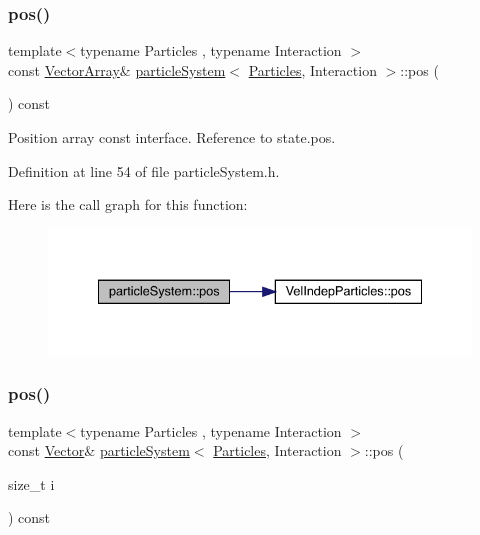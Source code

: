 \subsubsection{\texorpdfstring{pos()}{pos()}\hspace{0.1cm}{\footnotesize\ttfamily [1/2]}}
{\footnotesize\ttfamily template$<$typename Particles , typename Interaction $>$ \\
const \mbox{\hyperlink{classparticle_system_ac8049667a0d05e76b836642503a71c12}{Vector\+Array}}\& \mbox{\hyperlink{classparticle_system}{particle\+System}}$<$ \mbox{\hyperlink{struct_particles}{Particles}}, Interaction $>$\+::pos (\begin{DoxyParamCaption}{ }\end{DoxyParamCaption}) const\hspace{0.3cm}{\ttfamily [inline]}}



Position array const interface. Reference to state.\+pos. 



Definition at line 54 of file particle\+System.\+h.

Here is the call graph for this function\+:\nopagebreak
\begin{figure}[H]
\begin{center}
\leavevmode
\includegraphics[width=334pt]{classparticle_system_a7a4b29e872ff56670d6ad553df57b22b_cgraph}
\end{center}
\end{figure}
\mbox{\label{classparticle_system_ae18ea167d5145d52067ae6661a416c4c}} 
\subsubsection{\texorpdfstring{pos()}{pos()}\hspace{0.1cm}{\footnotesize\ttfamily [2/2]}}
{\footnotesize\ttfamily template$<$typename Particles , typename Interaction $>$ \\
const \mbox{\hyperlink{classparticle_system_a76c99c2b05db108a24c6e6ccbbd93af1}{Vector}}\& \mbox{\hyperlink{classparticle_system}{particle\+System}}$<$ \mbox{\hyperlink{struct_particles}{Particles}}, Interaction $>$\+::pos (\begin{DoxyParamCaption}\item[{size\+\_\+t}]{i }\end{DoxyParamCaption}) const\hspace{0.3cm}{\ttfamily [inline]}}



